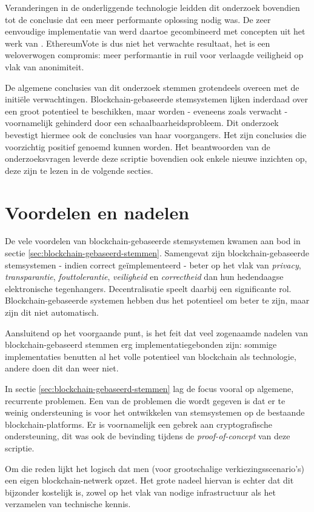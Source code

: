 Veranderingen in de onderliggende technologie leidden dit onderzoek bovendien tot de conclusie dat een meer performante oplossing nodig was. De zeer eenvoudige implementatie van \textcite{McCubin2019} werd daartoe gecombineerd met concepten uit het werk van \textcite{McCorry2017}. EthereumVote is dus niet het verwachte resultaat, het is een weloverwogen compromis: meer performantie in ruil voor verlaagde veiligheid op vlak van anonimiteit. 

De algemene conclusies van dit onderzoek stemmen grotendeels overeen met de initiële verwachtingen.  Blockchain-gebaseerde stemsystemen lijken inderdaad over een groot potentieel te beschikken, maar worden - eveneens zoals verwacht - voornamelijk gehinderd  door een schaalbaarheidsprobleem. Dit onderzoek bevestigt hiermee ook de conclusies van haar voorgangers. Het zijn conclusies die voorzichtig positief genoemd kunnen worden. Het beantwoorden van de onderzoeksvragen leverde deze scriptie bovendien ook enkele nieuwe inzichten op, deze zijn te lezen in de volgende secties.
\section{Voordelen en nadelen}
De vele voordelen van blockchain-gebaseerde stemsystemen kwamen aan bod in sectie \ref{sec:blockchain-gebaseerd-stemmen}. Samengevat zijn blockchain-gebaseerde stemsystemen  - indien correct geïmplementeerd - beter op het vlak van \textit{privacy}, \textit{transparantie},  \textit{fouttolerantie},  \textit{veiligheid} en \textit{correctheid} dan hun hedendaagse elektronische tegenhangers. Decentralisatie speelt daarbij een significante rol. Blockchain-gebaseerde systemen hebben dus het potentieel om beter te zijn, maar zijn dit niet automatisch.
	
Aansluitend op het voorgaande punt, is het feit dat veel zogenaamde nadelen van blockchain-gebaseerd stemmen erg implementatiegebonden zijn: sommige implementaties benutten al het volle potentieel van blockchain als technologie, andere doen dit dan weer niet. 

In sectie \ref{sec:blockchain-gebaseerd-stemmen} lag de focus vooral op algemene, recurrente problemen. Een van de problemen die wordt gegeven is dat er te weinig ondersteuning is voor het ontwikkelen van stemsystemen op de bestaande blockchain-platforms. Er is voornamelijk een gebrek aan cryptografische ondersteuning, dit was ook de bevinding tijdens de \textit{proof-of-concept} van deze scriptie.
	
Om die reden lijkt het logisch dat men (voor grootschalige verkiezingsscenario's) een eigen blockchain-netwerk opzet. Het grote nadeel hiervan is echter dat dit bijzonder kostelijk is, zowel op het vlak van nodige infrastructuur als het verzamelen van technische kennis.
	
